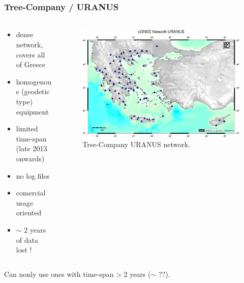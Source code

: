 \documentclass{beamer}
\begin{document}
\begin{frame}\frametitle{Tree-Company / URANUS}\framesubtitle{}
\begin{columns}[T] %
\begin{column}{.40\textwidth}
  \begin{itemize}
    \item<pro@1-> dense network, covers all of Greece
    \item<pro@1-> homogenous (geodetic type) equipment
    \item<con@1-> limited time-span (late 2013 onwards)
    \item<con@1-> no log files
    \item<con@1-> comercial usage oriented
    \item<con@1-> $\sim$ 2 years of data lost !
  \end{itemize}
\end{column}%
\hfill%
\begin{column}{.60\textwidth}
 \begin{figure}
 \begin{center}
 \includegraphics[trim={1cm 2cm 1cm 2.5cm},clip,width=.9\textwidth]{img/uranus.eps}
 \caption{Tree-Company URANUS network.}
 \label{fig:uranus}
 \end{center}
 \end{figure}
\end{column}%
\end{columns}
  \begin{block}{}
  Can nonly use ones with time-span > 2 years ($\sim$ ??). 
  \end{block}
\end{frame}
\end{document}
